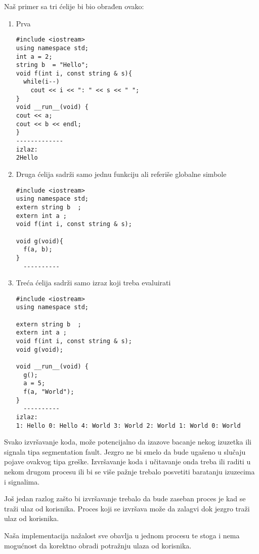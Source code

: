 \documentclass[a4paper]{article}
\begin{document}
{Naš primer sa tri ćelije bi bio obrađen ovako:

\begin{enumerate}
    \item Prva 
      
    \begin{verbatim}
#include <iostream>
using namespace std;
int a = 2;
string b  = "Hello";
void f(int i, const string & s){
  while(i--)
    cout << i << ": " << s << " ";
}
void __run__(void) {
cout << a;
cout << b << endl;
}
-------------
izlaz:
2Hello
      \end{verbatim}

  \item Druga ćelija sadrži samo jednu funkciju ali referiše globalne simbole

      \begin{verbatim}
#include <iostream>
using namespace std;
extern string b  ;
extern int a ;
void f(int i, const string & s);

void g(void){
  f(a, b);
}
  ----------
      \end{verbatim}

  \item Treća ćelija sadrži samo izraz koji treba evaluirati

      \begin{verbatim}
#include <iostream>
using namespace std;

extern string b  ;
extern int a ;
void f(int i, const string & s);
void g(void);

void __run__(void) { 
  g();
  a = 5;
  f(a, "World"); 
}
  ----------
izlaz:
1: Hello 0: Hello 4: World 3: World 2: World 1: World 0: World
      \end{verbatim}

\end{enumerate}

Svako izvršavanje koda,  može potencijalno
da izazove bacanje nekog izuzetka ili signala tipa segmentation fault. Jezgro
ne bi smelo da bude ugašeno u slučaju pojave ovakvog tipa greške.
Izvršavanje koda i učitavanje onda treba ili raditi u nekom drugom procesu ili bi
se više pažnje trebalo posvetiti baratanju izuzecima i signalima.

Još jedan razlog zašto bi izvršavanje trebalo da bude zaseban proces je
kad se traži ulaz od korisnika. Proces koji se izvršava može da zalagvi dok
jezgro traži ulaz od korisnika.

Naša implementacija nažalost sve obavlja u jednom procesu te stoga i nema mogućnost
da korektno obradi potražnju ulaza od korisnika.


}
\end{document}

